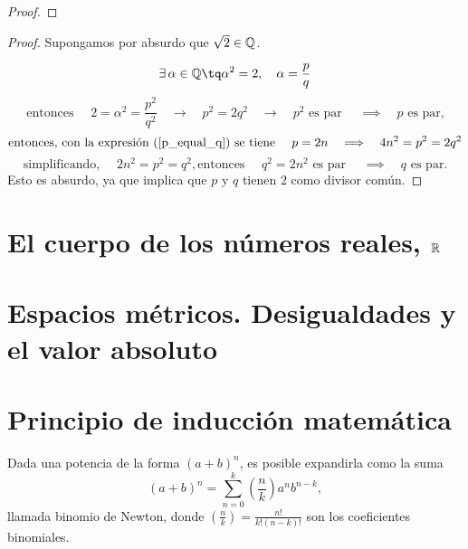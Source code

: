 {\begin{proof}
\end{proof}

\begin{proof}
    Supongamos por absurdo que $\sqrt{2} \in\Q$.

    \begin{equation}
        \exists\, \alpha\in\Q\tq\alpha^2 = 2, \quad \alpha = \frac{p}{q}
    \end{equation}
    \begin{equation}
        \label{p_equal_q}
        \textrm{entonces } \quad 2 = \alpha^2 = \frac{p^2}{q^2}\quad\rightarrow\quad p^2 = 2q^2 \quad\rightarrow\quad p^2\textrm{ es par }\quad\implies\quad p\textrm{ es par,}
    \end{equation}
    \begin{equation}
        \textrm{entonces, con la expresión (\ref{p_equal_q}) se tiene } \quad p = 2n\quad\implies\quad 4n^2 = p^2 = 2q^2
    \end{equation}
    \begin{equation}
        \textrm{simplificando, }\quad 2n^2 = p^2 = q^2, \textrm{entonces }\quad q^2 = 2n^2\textrm{ es par }\quad\implies\quad q\textrm{ es par.}
    \end{equation}
    Esto es absurdo, ya que implica que $p$ y $q$ tienen $2$ como divisor común.
\end{proof}

\section{El cuerpo de los números reales, $\R$}

\section{Espacios métricos. Desigualdades y el valor absoluto}

\section{Principio de inducción matemática}

\begin{theorem}
    Dada una potencia de la forma $\left( a + b \right)^n$, es posible expandirla como la suma
    \begin{equation}
        \left( a + b \right) ^n = \sum_{n=0}^k \left( \frac{n}{k} \right)a^n b^{n - k},
    \end{equation}
    llamada binomio de Newton, donde $\left( \frac{n}{k} \right) = \frac{n!}{k!\left( n - k \right)!}$ son los coeficientes binomiales.
\end{theorem}

}
